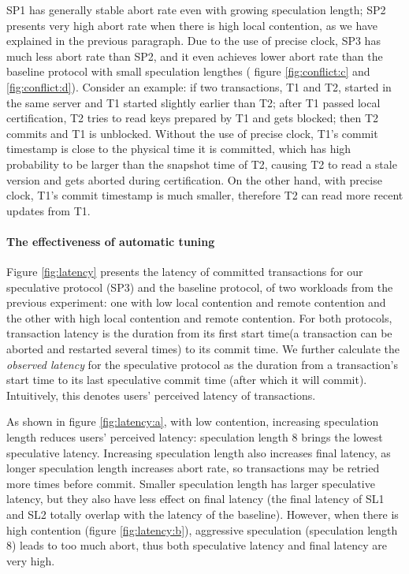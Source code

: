 SP1 has generally stable abort rate even with growing speculation length; SP2 presents very high abort rate when there is high local contention, as we have explained in the previous paragraph. Due to the use of precise clock, SP3 has much less abort rate than SP2, and it even achieves lower abort rate than the baseline protocol with small speculation lengthes ( figure \ref{fig:conflict:c} and \ref{fig:conflict:d}). Consider an example: if two transactions, T1 and T2, started in the same server and T1 started slightly earlier than T2; after T1 passed local certification, T2 tries to read keys prepared by T1 and gets blocked; then T2 commits and T1 is unblocked. Without the use of precise clock, T1's commit timestamp is close to the physical time it is committed, which has high probability to be larger than the snapshot time of T2, causing T2 to read a stale version and gets aborted during certification. On the other hand, with precise clock, T1's commit timestamp is much smaller, therefore T2 can read more recent updates from T1.

\paragraph{The effectiveness of automatic tuning} Figure \ref{fig:latency} presents the latency of committed transactions for our speculative protocol (SP3) and the baseline protocol, of two workloads from the previous experiment: one with low local contention and remote contention and the other with high local contention and remote contention. For both protocols, transaction latency is the duration from its first start time(a transaction can be aborted and restarted several times) to its commit time. We further calculate the \textit{observed latency} for the speculative protocol as the duration from a transaction's start time to its last speculative commit time (after which it will commit). Intuitively, this denotes users' perceived latency of transactions. 

As shown in figure \ref{fig:latency:a}, with low contention, increasing speculation length reduces users' perceived latency: speculation length 8 brings the lowest speculative latency. Increasing speculation length also increases final latency, as longer speculation length increases abort rate, so transactions may be retried more times before commit. Smaller speculation length has larger speculative latency, but they also have less effect on final latency (the final latency of SL1 and SL2 totally overlap with the latency of the baseline). However, when there is high contention (figure \ref{fig:latency:b}), aggressive speculation (speculation length 8) leads to too much abort, thus both speculative latency and final latency are very high.


